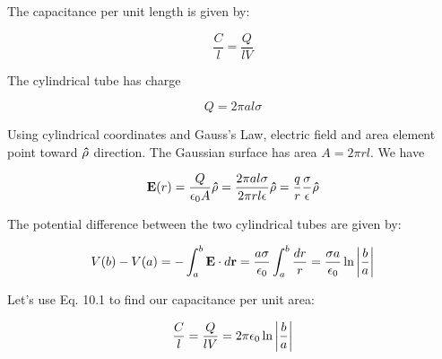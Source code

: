 \documentclass{article}
\numberwithin{equation}{section}
\numberwithin{figure}{section}
\newcommand{\vbh}[1]{\vb{\hat{#1}}}
\begin{document}
The capacitance per unit length is given by:

\begin{equation}
    \frac{C}{l} = \frac{Q}{lV}
\end{equation}

The cylindrical tube has charge 

\begin{equation}
    Q = 2 \pi a l \sigma
\end{equation}

Using cylindrical coordinates and Gauss's Law, electric field and area element point toward $\vbh \rho$ direction. The Gaussian surface has area $A = 2\pi r l$. We have

\begin{equation}
    \vb E(r) = \frac{Q}{\epsilon_0 A} \vbh \rho  = \frac{2 \pi a l \sigma}{2 \pi r l \epsilon} \vbh \rho = \frac{q}{r} \frac{\sigma}{\epsilon} \vbh \rho
\end{equation}

The potential difference between the two cylindrical tubes are given by:

\begin{equation}
    V(b) - V(a) = - \int_a^b \vb E \cdot d \vb r = \frac{a\sigma}{\epsilon_0} \int^b_a \frac{dr}{r} = \frac{\sigma a}{\epsilon_0} \ln \abs{\frac{b}{a}}
 \end{equation}

Let's use Eq. 10.1 to find our capacitance per unit area:

\begin{equation}
    \frac{C}{l} = \frac{Q}{lV} = 2\pi \epsilon_0 \ln \abs{ \frac{b}{a}}
\end{equation}
\end{document}
